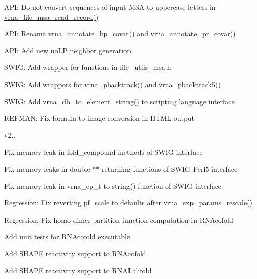 \begin{DoxyItemize}
\item A\+PI\+: Do not convert sequences of input M\+SA to uppercase letters in \hyperlink{group__file__utils_ga59204cd1daa4927f5127cc65a2886efd}{vrna\+\_\+file\+\_\+msa\+\_\+read\+\_\+record()}
\item A\+PI\+: Rename vrna\+\_\+annotate\+\_\+bp\+\_\+covar() and vrna\+\_\+annotate\+\_\+pr\+\_\+covar()
\item A\+PI\+: Add new no\+LP neighbor generation
\item S\+W\+IG\+: Add wrapper for functions in file\+\_\+utils\+\_\+msa.\+h
\item S\+W\+IG\+: Add wrappers for \hyperlink{group__subopt__stochbt_ga901fe42a33b07be083421741bf7dc610}{vrna\+\_\+pbacktrack()} and \hyperlink{group__subopt__stochbt_ga347375a4da8bdff74639529847f97d4f}{vrna\+\_\+pbacktrack5()}
\item S\+W\+IG\+: Add vrna\+\_\+db\+\_\+to\+\_\+element\+\_\+string() to scripting language interface
\item R\+E\+F\+M\+AN\+: Fix formula to image conversion in H\+T\+ML output
\end{DoxyItemize}

v2..
\begin{DoxyItemize}
\item Fix memory leak in fold\+\_\+compound methods of S\+W\+IG interface
\item Fix memory leaks in double $\ast$$\ast$ returning functions of S\+W\+IG Perl5 interface
\item Fix memory leak in vrna\+\_\+ep\+\_\+t to-\/string() function of S\+W\+IG interface
\item Regression\+: Fix reverting pf\+\_\+scale to defaults after \hyperlink{group__energy__parameters_gad607bc3a5b5da16400e2ca4ea5560233}{vrna\+\_\+exp\+\_\+params\+\_\+rescale()}
\item Regression\+: Fix homo-\/dimer partition function computation in R\+N\+Acofold
\item Add unit tests for R\+N\+Acofold executable
\item Add S\+H\+A\+PE reactivity support to R\+N\+Acofold
\item Add S\+H\+A\+PE reactivity support to R\+N\+A\+Lalifold
\end{DoxyItemize}

